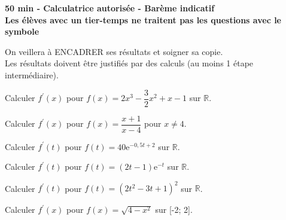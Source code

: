 \documentclass[11pt,a4paper]{article}  %
\begin{document}
	\graphicspath{{images/}}
	
	\begin{center}
		
	\end{center}
	\begin{center}\textbf{50 min - Calculatrice autorisée - Barème indicatif}\\
		\textbf{Les élèves avec un tier-temps ne traitent pas les questions avec  le symbole }
	\end{center}
	
	\begin{center}
		On veillera à ENCADRER ses résultats et soigner sa copie.\\
		Les résultats doivent être justifiés par des calculs (au moins 1 étape intermédiaire).
	\end{center}
	

\begin{enumMet}
	\item Calculer $f^{\prime}(x)$ pour $f(x)=2 x^3-\dfrac{3}{2} x^2+x-1$ sur $\mathbb{R}$. 
	\item Calculer $f^{\prime}(x)$ pour $f(x)=\dfrac{x+1}{x-4}$ pour $x \neq 4$.
	\item Calculer $f^{\prime}(t)$ pour $f(t)=40 \mathrm{e}^{-0,5 t+2}$ sur $\mathbb{R}$. 
	\item Calculer $f^{\prime}(t)$ pour $f(t)=(2 t-1) \mathrm{e}^{-t}$ sur $\mathbb{R}$.
	\item Calculer $f^{\prime}(t)$ pour $f(t)=\left(2 t^2-3 t+1\right)^2$ sur $\mathbb{R}$.
	\item Calculer $f^{\prime}(x)$ pour $f(x)=\sqrt{4-x^2}$ sur [-2; 2].
\end{enumMet}
\end{document}
